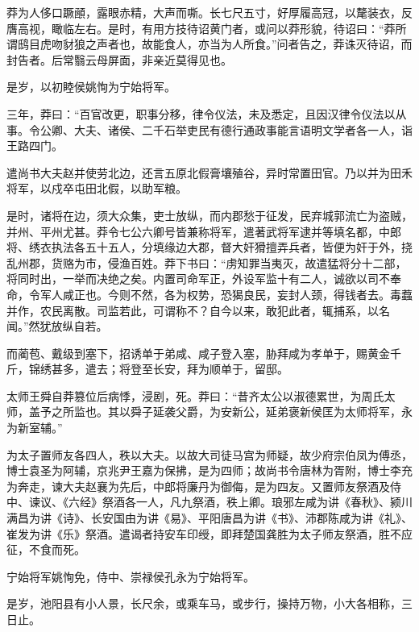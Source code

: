 \documentclass[12pt,UTF8]{ctexbook}
\begin{document}
莽为人侈口蹶顄，露眼赤精，大声而嘶。长七尺五寸，好厚履高冠，以氂装衣，反膺高视，瞰临左右。是时，有用方技待诏黄门者，或问以莽形貌，待诏曰：“莽所谓鸱目虎吻豺狼之声者也，故能食人，亦当为人所食。”问者告之，莽诛灭待诏，而封告者。后常翳云母屏面，非亲近莫得见也。



是岁，以初睦侯姚恂为宁始将军。



三年，莽曰：“百官改更，职事分移，律令仪法，未及悉定，且因汉律令仪法以从事。令公卿、大夫、诸侯、二千石举吏民有德行通政事能言语明文学者各一人，诣王路四门。



遣尚书大夫赵并使劳北边，还言五原北假膏壤殖谷，异时常置田官。乃以并为田禾将军，以戍卒屯田北假，以助军粮。



是时，诸将在边，须大众集，吏士放纵，而内郡愁于征发，民弃城郭流亡为盗贼，并州、平州尤甚。莽令七公六卿号皆兼称将军，遣著武将军逮并等填名都，中郎将、绣衣执法各五十五人，分填缘边大郡，督大奸猾擅弄兵者，皆便为奸于外，挠乱州郡，货赂为市，侵渔百姓。莽下书曰：“虏知罪当夷灭，故遣猛将分十二部，将同时出，一举而决绝之矣。内置司命军正，外设军监十有二人，诚欲以司不奉命，令军人咸正也。今则不然，各为权势，恐猲良民，妄封人颈，得钱者去。毒蠚并作，农民离散。司监若此，可谓称不？自今以来，敢犯此者，辄捕系，以名闻。”然犹放纵自若。



而蔺苞、戴级到塞下，招诱单于弟咸、咸子登入塞，胁拜咸为孝单于，赐黄金千斤，锦绣甚多，遣去；将登至长安，拜为顺单于，留邸。



太师王舜自莽篡位后病悸，浸剧，死。莽曰：“昔齐太公以淑德累世，为周氏太师，盖予之所监也。其以舜子延袭父爵，为安新公，延弟褒新侯匡为太师将军，永为新室辅。”



为太子置师友各四人，秩以大夫。以故大司徒马宫为师疑，故少府宗伯凤为傅丞，博士袁圣为阿辅，京兆尹王嘉为保拂，是为四师；故尚书令唐林为胥附，博士李充为奔走，谏大夫赵襄为先后，中郎将廉丹为御侮，是为四友。又置师友祭酒及侍中、谏议、《六经》祭酒各一人，凡九祭酒，秩上卿。琅邪左咸为讲《春秋》、颍川满昌为讲《诗》、长安国由为讲《易》、平阳唐昌为讲《书》、沛郡陈咸为讲《礼》、崔发为讲《乐》祭酒。遣谒者持安车印绶，即拜楚国龚胜为太子师友祭酒，胜不应征，不食而死。



宁始将军姚恂免，侍中、崇禄侯孔永为宁始将军。



是岁，池阳县有小人景，长尺余，或乘车马，或步行，操持万物，小大各相称，三日止。
\end{document}
